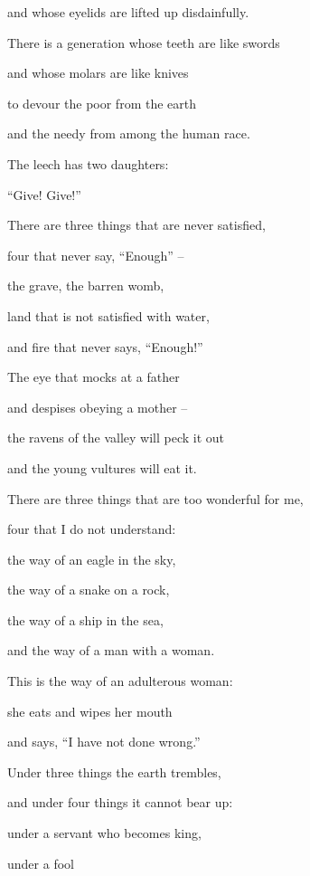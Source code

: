 {\par }{\Q and whose eyelids
are lifted
up disdainfully.
\par }{\Q {}There is a generation
whose teeth
are like swords
\par }{\Q and whose molars
are like knives
\par }{\Q to devour
the poor
from the earth
\par }{\Q and the needy
from among the human race.
\par }{\Q {}The leech
has two
daughters:


\par }{\Q “Give! Give!”

\par }{\Q There are three
things
that are never
satisfied,
\par }{\Q four
that never
say,
“Enough” –
\par }{\Q {}the grave,
the barren
womb,
\par }{\Q land
that is not
satisfied
with water,
\par }{\Q and fire
that never
says,
“Enough!”
\par }{\Q {}The eye
that mocks
at a father
\par }{\Q and despises
obeying
a mother
–
\par }{\Q the ravens
of the valley
will peck
it out
\par }{\Q and the young
vultures
will eat it.
\par }{\Q {}There are three
things that are
too wonderful
for me,
\par }{\Q four
that I do not
understand:
\par }{\Q {}the way
of an eagle
in the sky,
\par }{\Q the way
of a snake
on
a rock,
\par }{\Q the way
of a ship
in the sea,
\par }{\Q and the way
of a man
with a woman.
\par }{\Q {}This
is the way
of an adulterous
woman:
\par }{\Q she eats
and wipes
her mouth
\par }{\Q and says,
“I have not
done
wrong.”
\par }{\Q {}Under
three
things the earth
trembles,
\par }{\Q and under
four
things it cannot
bear up:
\par }{\Q {}under
a servant
who becomes
king,
\par }{\Q under a fool
}
